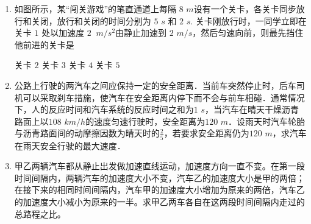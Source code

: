 \begin{enumerate}
\begin{enumerate}
\end{enumerate}




\item 
{}
如图所示，某“闯关游戏”的笔直通道上每隔 $ 8 $ $ m $设有一个关卡，各关卡同步放行和关闭，放行和关闭的时间分别为 $ 5 $ $ s $ 和 $ 2 $ $ s $. 关卡刚放行时，一同学立即在关卡 $ 1 $ 处以加速度 $ 2 $ $ \ m/s ^{2} $由静止加速到 $ 2 $ $ m /s $，然后匀速向前，则最先挡住他前进的关卡是  
\begin{figure}[h!]
\centering

\end{figure}

\fourchoices
{关卡 $ 2 $ }
{关卡 $ 3 $ }
{关卡 $ 4 $ }
{关卡 $ 5 $ }


\item 
{}
公路上行驶的两汽车之间应保持一定的安全距离．当前车突然停止时，后车司机可以采取刹车措施，使汽车在安全距离内停下而不会与前车相碰．通常情况下，人的反应时间和汽车系统的反应时间之和为$ 1 $ $ s $，当汽车在晴天干燥沥青路面上以$ 108 $ $ km/h $的速度匀速行驶时，安全距离为$ 120 $ $ m $．设雨天时汽车轮胎与沥青路面间的动摩擦因数为晴天时的$ \frac{ 2 }{ 5 } $，若要求安全距离仍为$ 120 $ $ m $，求汽车在雨天安全行驶的最大速度．



\newpage		
\item 
{}
甲乙两辆汽车都从静止出发做加速直线运动，加速度方向一直不变。在第一段时间间隔内，两辆汽车的加速度大小不变，汽车乙的加速度大小是甲的两倍；在接下来的相同时间间隔内，汽车甲的加速度大小增加为原来的两倍，汽车乙的加速度大小减小为原来的一半。求甲乙两车各自在这两段时间间隔内走过的总路程之比。





\end{enumerate}
